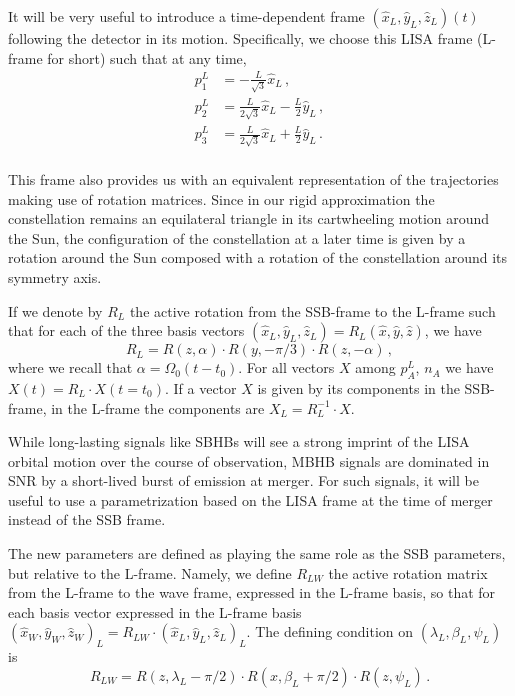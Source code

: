 \documentclass[aps,showpacs,twocolumn,prd,superscriptaddress,nofootinbib]{revtex4-1}
\newcommand{\be}{\begin{equation}}
\newcommand{\ee}{\end{equation}}
\newcommand{\bsub}{\begin{subequations}}
\newcommand{\esub}{\end{subequations}}
\begin{document}
It will be very useful to introduce a time-dependent frame $(\hat{x}_{L}, \hat{y}_{L}, \hat{z}_{L})(t)$ following the detector in its motion. Specifically, we choose this LISA frame (L-frame for short) such that at any time,
\bsub
\begin{align}
	p_{1}^{L} &= - \frac{L}{\sqrt{3}} \hat{x}_{L} \,,\\
	p_{2}^{L} &= \frac{L}{2\sqrt{3}} \hat{x}_{L} - \frac{L}{2} \hat{y}_{L} \,,\\
	p_{3}^{L} &= \frac{L}{2\sqrt{3}} \hat{x}_{L} + \frac{L}{2} \hat{y}_{L} \,.\\
\end{align}
\esub

This frame also provides us with an equivalent representation of the trajectories making use of rotation matrices. Since in our rigid approximation the constellation remains an equilateral triangle in its cartwheeling motion around the Sun, the configuration of the constellation at a later time is given by a rotation around the Sun composed with a rotation of the constellation around its symmetry axis.

If we denote by $R_{L}$ the active rotation from the SSB-frame to the L-frame such that for each of the three basis vectors $(\hat{x}_{L}, \hat{y}_{L}, \hat{z}_{L}) = R_{L} (\hat{x}, \hat{y}, \hat{z})$, we have
\be\label{eq:RL}
	R_{L} = R(z, \alpha) \cdot R(y, -\pi/3) \cdot R(z, -\alpha) \,,
\ee
where we recall that $\alpha = \Omega_{0} (t-t_{0}) $. For all vectors $X$ among $p_{A}^{L}$, $n_{A}$ we have $X(t) = R_{L} \cdot X(t=t_{0})$. If a vector $X$ is given by its components in the SSB-frame, in the L-frame the components are $X_{L} = R_{L}^{-1} \cdot X$.

While long-lasting signals like SBHBs will see a strong imprint of the LISA orbital motion over the course of observation, MBHB signals are dominated in SNR by a short-lived burst of emission at merger. For such signals, it will be useful to use a parametrization based on the LISA frame at the time of merger instead of the SSB frame.

The new parameters are defined as playing the same role as the SSB parameters, but relative to the L-frame. Namely, we define $R_{LW}$ the active rotation matrix from the L-frame to the wave frame, expressed in the L-frame basis, so that for each basis vector expressed in the L-frame basis $(\hat{x}_{W}, \hat{y}_{W}, \hat{z}_{W})_{L} = R_{LW} \cdot (\hat{x}_{L}, \hat{y}_{L}, \hat{z}_{L})_{L}$. The defining condition on $(\lambda_{L}, \beta_{L}, \psi_{L})$ is
\be\label{eq:defRLW}
	R_{LW} = R(z, \lambda_{L} - \pi/2) \cdot R(x, \beta_{L} + \pi/2 ) \cdot R(z, \psi_{L}) \,.
\ee
\end{document}
